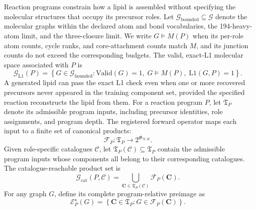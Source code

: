 \documentclass{article}
\begin{document}
Reaction programs constrain how a lipid is assembled without specifying the molecular structures
that occupy its precursor roles.
Let $\mathcal{G}_{\mathrm{bounded}}\subseteq\mathcal{G}$ denote the molecular graphs within the
declared atom and bond vocabularies, the 194-heavy-atom limit, and the three-closure limit.
We write $G\models M(P)$ when its per-role atom counts, cycle ranks, and core-attachment counts match
$M$, and its junction counts do not exceed the corresponding budgets.
The valid, exact-L1 molecular space associated with $P$ is
\begin{equation}
    \mathcal{G}_{\mathrm{L1}}(P)
    =
    \left\{
        G\in\mathcal{G}_{\mathrm{bounded}}:
        \mathrm{Valid}(G)=1,\;
        G\models M(P),\;
        \mathrm{L1}(G,P)=1
    \right\}.
\end{equation}
A generated lipid can pass the exact L1 check even when one or more recovered precursors never
appeared in the training component set, provided the specified reaction reconstructs the lipid from
them.
For a reaction program $P$, let $\mathfrak{T}_P$ denote its admissible program inputs, including
precursor identities, role assignments, and program depth.
The registered forward operator maps each input to a finite set of canonical products:
\begin{equation}
    \mathcal{F}_P:
    \mathfrak{T}_P
    \longrightarrow
    2^{\mathfrak{G}_{N,K}}.
\end{equation}
Given role-specific catalogues $\mathcal C$, let
$\mathfrak{T}_P(\mathcal C)\subseteq\mathfrak{T}_P$ contain the admissible program inputs whose
components all belong to their corresponding catalogues.
The catalogue-reachable product set is
\begin{equation}
    \mathcal{G}_{\mathrm{cat}}(P,\mathcal C)
    =
    \bigcup_{\mathbf C\in\mathfrak{T}_P(\mathcal C)}
    \mathcal{F}_P(\mathbf C).
\end{equation}
For any graph $G$, define its complete program-relative preimage as
\begin{equation}
    \mathcal{E}^{\star}_P(G)
    =
    \left\{
        \mathbf C\in\mathfrak{T}_P:
        G\in\mathcal{F}_P(\mathbf C)
    \right\}.
\end{equation}
\end{document}
